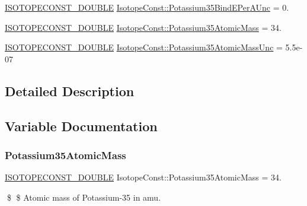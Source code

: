 \begin{DoxyCompactItemize}
\mbox{\hyperlink{group___isotope_const-_macros_ga8f45a7272ce02c0b4c65c44636ed719a}{I\+S\+O\+T\+O\+P\+E\+C\+O\+N\+S\+T\+\_\+\+D\+O\+U\+B\+LE}} \mbox{\hyperlink{group___isotope_const-_potassium-_k35_gaa52fad3362c0673c6cde13d13ef99c9e}{Isotope\+Const\+::\+Potassium35\+Bind\+E\+Per\+A\+Unc}} = 0.
\item 
\mbox{\hyperlink{group___isotope_const-_macros_ga8f45a7272ce02c0b4c65c44636ed719a}{I\+S\+O\+T\+O\+P\+E\+C\+O\+N\+S\+T\+\_\+\+D\+O\+U\+B\+LE}} \mbox{\hyperlink{group___isotope_const-_potassium-_k35_gabd7ea9d14f113627f91cd0ba8ab3c5df}{Isotope\+Const\+::\+Potassium35\+Atomic\+Mass}} = 34.
\item 
\mbox{\hyperlink{group___isotope_const-_macros_ga8f45a7272ce02c0b4c65c44636ed719a}{I\+S\+O\+T\+O\+P\+E\+C\+O\+N\+S\+T\+\_\+\+D\+O\+U\+B\+LE}} \mbox{\hyperlink{group___isotope_const-_potassium-_k35_ga2ebf01c173950024aa2fcc555306e00c}{Isotope\+Const\+::\+Potassium35\+Atomic\+Mass\+Unc}} = 5.\+5e-\/07
\end{DoxyCompactItemize}


\subsection{Detailed Description}


\subsection{Variable Documentation}
\mbox{\label{group___isotope_const-_potassium-_k35_gabd7ea9d14f113627f91cd0ba8ab3c5df}} 
\subsubsection{\texorpdfstring{Potassium35\+Atomic\+Mass}{Potassium35AtomicMass}}
{\footnotesize\ttfamily \mbox{\hyperlink{group___isotope_const-_macros_ga8f45a7272ce02c0b4c65c44636ed719a}{I\+S\+O\+T\+O\+P\+E\+C\+O\+N\+S\+T\+\_\+\+D\+O\+U\+B\+LE}} Isotope\+Const\+::\+Potassium35\+Atomic\+Mass = 34.}

\$ \$ Atomic mass of Potassium-\/35 in amu. \mbox{\label{group___isotope_const-_potassium-_k35_ga2ebf01c173950024aa2fcc555306e00c}} 

